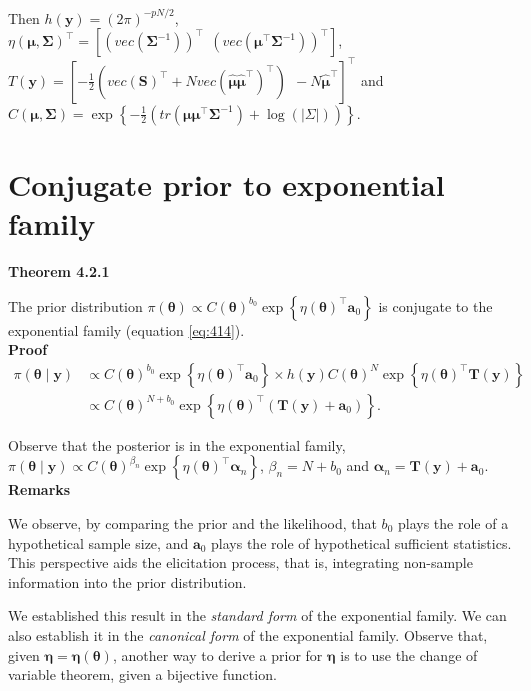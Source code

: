 \begin{enumerate}
Then $h(\bm{y})=(2\pi)^{-pN/2}$, $\eta(\bm{\mu},\bm{\Sigma})^{\top}=\left[\left(vec\left(\bm{\Sigma}^{-1}\right)\right)^{\top} \ \ \left(vec\left(\bm{\mu}^{\top}\bm{\Sigma}^{-1}\right)\right)^{\top}\right]$, $T(\bm{y})=\left[-\frac{1}{2}\left(vec\left(\bm{S}\right)^{\top}+N vec\left(\hat{\bm{\mu}}\hat{\bm{\mu}}^{\top}\right)^{\top}\right) \ \ -N\hat{\bm{\mu}}^{\top}\right]^{\top}$ and $C(\bm{\mu},\bm{\Sigma})=\exp\left\{-\frac{1}{2}\left(tr\left(\bm{\mu}\bm{\mu}^{\top}\bm{\Sigma}^{-1}\right)+\log(|\Sigma|)\right)\right\}$.
\end{enumerate}

\section{Conjugate prior to exponential family}\label{sec42}

\textbf{Theorem 4.2.1}

The prior distribution $\pi(\bm{\theta})\propto C(\bm{\theta})^{b_0}\exp\left\{\eta(\bm{\theta})^{\top}\bm{a}_0\right\}$ is conjugate to the exponential family (equation \ref{eq:414}).\\

\textbf{Proof}
\begin{align}
	\pi(\bm{\theta}\mid \bm{y})& \propto C(\bm{\theta})^{b_0}\exp\left\{\eta(\bm{\theta})^{\top}\bm{a}_0\right\} \times h(\bm{y}) C(\bm{\theta})^N\exp\left\{\eta(\bm{\theta})^{\top}\bm{T}(\bm{y})\right\}\nonumber\\
	& \propto C(\bm{\theta})^{N+b_0} \exp\left\{\eta(\bm{\theta})^{\top}(\bm{T}(\bm{y})+\bm{a}_0)\right\}.\nonumber 
\end{align}

Observe that the posterior is in the exponential family, $\pi(\bm{\theta}\mid \bm{y})\propto C(\bm{\theta})^{\beta_n} \exp\left\{\eta(\bm{\theta})^{\top}\bm{\alpha}_n\right\}$, $\beta_n=N+b_0$ and $\bm{\alpha}_n=\bm{T}(\bm{y})+\bm{a}_0$.\\

\textbf{Remarks}

We observe, by comparing the prior and the likelihood, that \( b_0 \) plays the role of a hypothetical sample size, and \( \bm{a}_0 \) plays the role of hypothetical sufficient statistics. This perspective aids the elicitation process, that is, integrating non-sample information into the prior distribution.

We established this result in the \textit{standard form} of the exponential family. We can also establish it in the \textit{canonical form} of the exponential family. Observe that, given \( \bm{\eta} = \bm{\eta}(\bm{\theta}) \), another way to derive a prior for \( \bm{\eta} \) is to use the change of variable theorem, given a bijective function.

